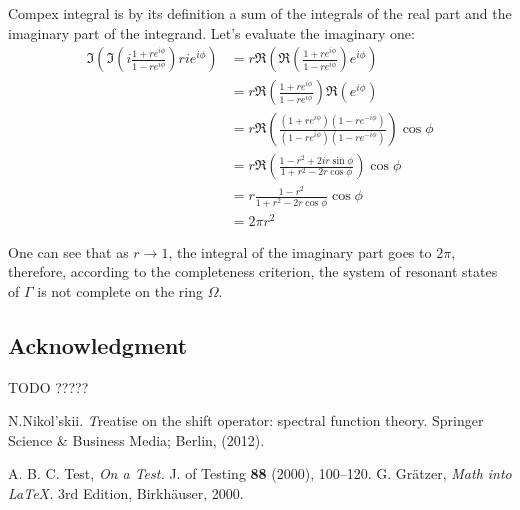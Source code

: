 \documentclass{birkjour}
\theoremstyle{definition}
\theoremstyle{remark}
\numberwithin{equation}{section}
\begin{document}
Compex integral is by its definition a sum of the integrals of the real part and the imaginary part of the integrand. Let's evaluate the imaginary one:
\begin{align*}
\Im \left(  \Im \left( i \frac{1 + r e^{i \phi}}{1 - r e^{i \phi}} \right) r i e^{i \phi} \right)
 &= r \Re \left(  \Re \left( \frac{1 + r e^{i \phi}}{1 - r e^{i \phi}} \right) e^{i \phi} \right) \\
 &= r \Re \left( \frac{1 + r e^{i \phi}}{1 - r e^{i \phi}} \right) \Re \left(   e^{i \phi} \right) \\
 &= r \Re \left( \frac{(1 + r e^{i \phi}) (1 - r e^{-i \phi}) }{(1 - r e^{i \phi}) (1 - r e^{-i \phi})} \right) \cos \phi \\
 &= r \Re \left( \frac{1 - r^2 + 2 i r \sin \phi}{1 + r^2 - 2 r \cos \phi} \right) \cos \phi \\
 &= r \frac{1 - r^2}{1 + r^2 - 2 r \cos \phi} \cos \phi \\
 &= 2 \pi r^2
\end{align*}

One can see that as $r \to 1$, the integral of the imaginary part goes to $2 \pi$, therefore, according to the completeness criterion, the system of resonant states of $\Gamma$ is not complete on the ring $\Omega$.


\subsection*{Acknowledgment}
TODO ?????


\begin{thebibliography}{1}
N.Nikol'skii. {\textit Treatise on the shift operator: spectral
function theory}. Springer Science \& Business Media; Berlin,
(2012).

 A. B. C. Test, \textit{On a Test.} J. of Testing
\textbf{88} (2000), 100--120.
 G. Gr\"atzer, \textit{Math into \LaTeX.} 3rd Edition,
Birkh\"auser, 2000.
\end{thebibliography}

\end{document}
